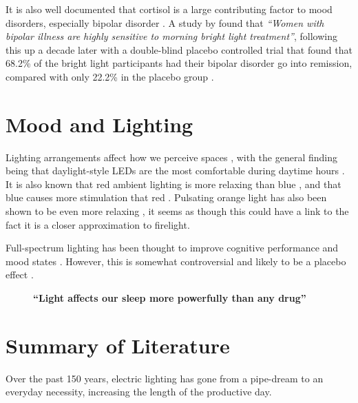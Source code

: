 It is also well documented that cortisol is a large contributing factor to mood disorders, especially bipolar disorder \citep{youngCortisolMoodDisorders2004}. A study by \citet{sitLightTherapyBipolar2007} found that \textit{``Women with bipolar illness are highly sensitive to morning bright light treatment''}, following this up a decade later with a double-blind placebo controlled trial that found that 68.2\% of the bright light participants had their bipolar disorder go into remission, compared with only 22.2\% in the placebo group \citep{sitAdjunctiveBrightLight2017}.

\section{Mood and Lighting}

Lighting arrangements affect how we perceive spaces \citep{durakImpactLightingArrangements2007}, with the general finding being that daylight-style LEDs are the most comfortable during daytime hours \citep{cajochenEffectDaylightLED2019}. It is also known that red ambient lighting is more relaxing than blue \citep{lauferPsychophysiologicalEffectsColoured2009}, and that blue causes more stimulation that red \citep{schweitzerInvestigationGenderAgerelated2016}. Pulsating orange light has also been shown to be even more relaxing \citep{wanInfluenceLightingColor2012}, it seems as though this could have a link to the fact it is a closer approximation to firelight.

Full-spectrum lighting has been thought to improve cognitive performance and mood states \citep{berryWorkEfficiencyMood1984}. However, this is somewhat controversial and likely to be a placebo effect \citep{veitchDemandCharacteristicsFull1991}.

\begin{figure}[t]
\centering
\LARGE
\textbf{``Light affects our sleep more powerfully than any drug''}

\citep{czeislerPerspectiveCastingLight2013}
\end{figure}


\section{Summary of Literature}
\label{sec:LitSummary}

Over the past 150 years, electric lighting has gone from a pipe-dream to an everyday necessity, increasing the length of the productive day. 

